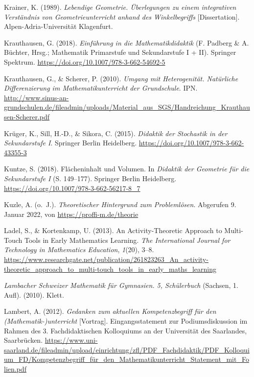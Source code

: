\documentclass[
  ngerman,
]{scrbook}
\newlength{\cslhangindent}
\newlength{\cslentryspacingunit} %
\newenvironment{CSLReferences}[2] %
 {%
  \setlength{\parindent}{0pt}
  \ifodd #1
  \let\oldpar\par
  \def\par{\hangindent=\cslhangindent\oldpar}
  \fi
  \setlength{\parskip}{#2\cslentryspacingunit}
 }%
 {}
\theoremstyle{definition}
\theoremstyle{definition}
\theoremstyle{definition}
\theoremstyle{definition}
\theoremstyle{remark}
\begin{document}
\begin{CSLReferences}{1}{0}
\leavevmode{}%
Krainer, K. (1989). \emph{Lebendige {Geometrie}. Überlegungen zu einem integrativen {Verständnis} von {Geometrieunterricht} anhand des {Winkelbegriffs}} {[}Dissertation{]}. Alpen-Adria-Universität Klagenfurt.

\leavevmode{}%
Krauthausen, G. (2018). \emph{Einführung in die {Mathematikdidaktik}} (F. Padberg \& A. Büchter, Hrsg.; Mathematik Primarstufe und Sekundarstufe I + II). Springer Spektrum. \url{https://doi.org/10.1007/978-3-662-54692-5}

\leavevmode{}%
Krauthausen, G., \& Scherer, P. (2010). \emph{Umgang mit {Heterogenität}. {Natürliche} {Differenzierung} im {Mathematikunterricht} der {Grundschule}}. IPN. \url{http://www.sinus-an-grundschulen.de/fileadmin/uploads/Material_aus_SGS/Handreichung_Krauthausen-Scherer.pdf}

\leavevmode{}%
Krüger, K., Sill, H.-D., \& Sikora, C. (2015). \emph{Didaktik der {Stochastik} in der {Sekundarstufe} {I}}. Springer Berlin Heidelberg. \url{https://doi.org/10.1007/978-3-662-43355-3}

\leavevmode{}%
Kuntze, S. (2018). Flächeninhalt und {Volumen}. In \emph{Didaktik der {Geometrie} für die {Sekundarstufe} {I}} (S. 149--177). Springer Berlin Heidelberg. \url{https://doi.org/10.1007/978-3-662-56217-8_7}

\leavevmode{}%
Kuzle, A. (o.~J.). \emph{Theoretischer {Hintergrund} zum {Problemlösen}}. Abgerufen 9. Januar 2022, von \url{https://proffi-m.de/theorie}

\leavevmode{}%
Ladel, S., \& Kortenkamp, U. (2013). An {Activity}-{Theoretic} {Approach} to {Multi}-{Touch} {Tools} in {Early} {Mathematics} {Learning}. \emph{The International Journal for Technology in Mathematics Education}, \emph{1}(20), 3--8. \url{https://www.researchgate.net/publication/261823263_An_activity-theoretic_approach_to_multi-touch_tools_in_early_maths_learning}

\leavevmode{}%
\emph{Lambacher {Schweizer} {Mathematik} für {Gymnasien}. 5, {Schülerbuch}} (Sachsen, 1. Aufl). (2010). Klett.

\leavevmode{}%
Lambert, A. (2012). \emph{Gedanken zum aktuellen {Kompetenzbegriff} für den ({Mathematik}-)unterricht} {[}Vortrag{]}. Eingangsstatement zur Podiumsdiskussion im Rahmen des 3. Fachdidaktischen Kolloquiums an der Universität des Saarlandes, Saarbrücken. \url{https://www.uni-saarland.de/fileadmin/upload/einrichtung/zfl/PDF_Fachdidaktik/PDF_Kolloquium_FD/Kompetenzbegriff_für_den_Mathematikunterricht_Statement_mit_Folien.pdf}


\end{CSLReferences}
\end{document}
